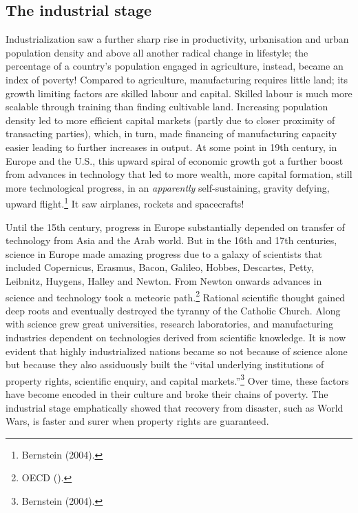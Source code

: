 \begin{multicols}{2}
\subsection*{The industrial stage}

Industrialization saw a further sharp rise in productivity, urbanisation and urban population density and above all another radical change in lifestyle; the percentage of a country's population engaged in agriculture, instead, became an index of poverty! Compared to agriculture, manufacturing requires little land; its growth limiting factors are skilled labour and capital. Skilled labour is much more scalable through training than finding cultivable land. Increasing population density led to more efficient capital markets (partly due to closer proximity of transacting parties), which, in turn, made financing of manufacturing capacity easier leading to further increases in output. At some point in 19th century, in Europe and the U.S., this upward spiral of economic growth got a further boost from advances in technology that led to more wealth, more capital formation, still more technological progress, in an \textit{apparently} self-sustaining, gravity defying, upward flight.\footnote{Bernstein (2004).} It saw airplanes, rockets and spacecrafts!

\vskip 2pt

Until the 15th century, progress in Europe substantially depended on transfer of technology from Asia and the Arab world. But in the 16th and 17th centuries, science in Europe made amazing progress due to a galaxy of scientists that included Copernicus, Erasmus, Bacon, Galileo, Hobbes, Descartes, Petty, Leibnitz, Huygens, Halley and Newton. From Newton onwards advances in science and technology took a meteoric path.\footnote{OECD ().} Rational scientific thought gained deep roots and eventually destroyed the tyranny of the Catholic Church. Along with science grew great universities, research laboratories, and manufacturing industries dependent on technologies derived from scientific knowledge. It is now evident that highly industrialized nations became so not because of science alone but because they also assiduously built the “vital underlying institutions of property rights, scientific enquiry, and capital markets.”\footnote{Bernstein (2004).} Over time, these factors have become encoded in their culture and broke their chains of poverty. The industrial stage emphatically showed that recovery from disaster, such as World Wars, is faster and surer when property rights are guaranteed.


\end{multicols}
